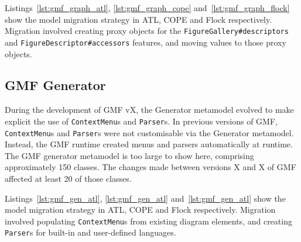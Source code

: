 
Listings~\ref{lst:gmf_graph_atl}, \ref{lst:gmf_graph_cope} and~\ref{lst:gmf_graph_flock} show the model migration strategy in ATL, COPE and Flock respectively. Migration involved creating proxy objects for the \texttt{Fi\-gu\-reG\-al\-le\-ry\#de\-sc\-ri\-pt\-ors} and \texttt{Fi\-gu\-reDe\-sc\-ri\-pt\-or\#ac\-ce\-ss\-ors} features, and moving values to those proxy objects.



\subsection{GMF Generator}
During the development of GMF vX, the Generator metamodel evolved to make explicit the use of \texttt{Co\-nt\-e\-xtMe\-nu}s and \texttt{Pa\-rs\-er}s. In previous versions of GMF, \texttt{Co\-nt\-e\-xtMe\-nu}s and \texttt{Pa\-rs\-er}s were not customisable via the Generator metamodel. Instead, the GMF runtime created menus and parsers automatically at runtime. The GMF generator metamodel is too large to show here, comprising approximately 150 classes. The changes made between versions X and X of GMF affected at least 20 of those classes.

Listings~\ref{lst:gmf_gen_atl}, \ref{lst:gmf_gen_atl} and~\ref{lst:gmf_gen_atl} show the model migration strategy in ATL, COPE and Flock respectively. Migration involved populating \texttt{Co\-nt\-e\-xtMe\-nu}s from existing diagram elements, and creating \texttt{Pa\-rs\-er}s for built-in and user-defined languages.


